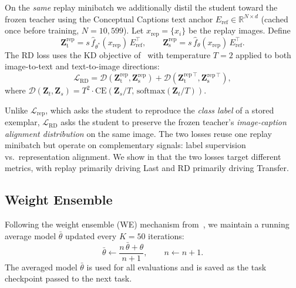 \documentclass{article}
\begin{document}
  On the \emph{same} replay minibatch we additionally distil the student toward the
  frozen teacher using the Conceptual Captions text anchor
  $E_{\text{ref}} \in \mathbb{R}^{N \times d}$ (cached once before training,
  $N{=}10{,}599$). Let $x_{\text{rep}} = \{x_i\}$ be the replay images. Define
  \begin{equation}
    \mathbf{Z}^{\text{rep}}_\text{t} =
      s\,\hat{f}_{\theta^*}(x_{\text{rep}})\,E_{\text{ref}}^\top,
    \qquad
    \mathbf{Z}^{\text{rep}}_\text{s} =
      s\,\hat{f}_{\theta}(x_{\text{rep}})\,E_{\text{ref}}^\top.
  \end{equation}
  The RD loss uses the KD objective of~\citet{hinton2015distilling} with
  temperature $T{=}2$ applied to both image-to-text and text-to-image directions:
  \begin{equation}
    \mathcal{L}_{\text{RD}} =
      \mathcal{D}(\mathbf{Z}^{\text{rep}}_\text{t}, \mathbf{Z}^{\text{rep}}_\text{s})
    + \mathcal{D}(\mathbf{Z}^{\text{rep}\,\top}_\text{t}, \mathbf{Z}^{\text{rep}\,\top}_\text{s}),
    \label{eq:rd}
  \end{equation}
  where $\mathcal{D}(\mathbf{Z}_t, \mathbf{Z}_s) = T^2 \cdot
  \mathrm{CE}(\mathbf{Z}_s / T,\, \mathrm{softmax}(\mathbf{Z}_t / T))$.

  Unlike $\mathcal{L}_{\text{rep}}$, which asks the student to reproduce the
  \emph{class label} of a stored exemplar, $\mathcal{L}_{\text{RD}}$ asks the
  student to preserve the frozen teacher's \emph{image-caption alignment
  distribution} on the same image. The two losses reuse one replay minibatch but
  operate on complementary signals: label supervision vs.\ representation
  alignment. We show in  that the two losses target different
  metrics, with replay primarily driving Last and RD primarily driving Transfer.

  \subsection{Weight Ensemble}
  Following the weight ensemble (WE) mechanism from~\citet{zheng2023zscl}, we
  maintain a running average model $\bar{\theta}$ updated every $K{=}50$
  iterations:
  \begin{equation}
    \bar{\theta} \leftarrow \frac{n\,\bar{\theta} + \theta}{n + 1}, \qquad
    n \leftarrow n + 1.
  \end{equation}
  The averaged model $\bar{\theta}$ is used for all evaluations and is saved as
  the task checkpoint passed to the next task.
\end{document}
